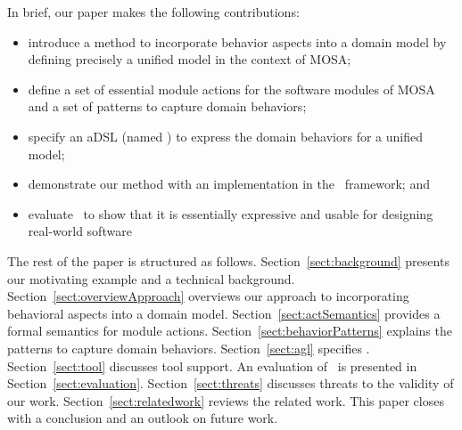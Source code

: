 In brief, our paper makes the following contributions:
%
\begin{itemize}[leftmargin=*]
	\item introduce a method to incorporate behavior aspects into a domain model by defining precisely a unified model in the context of MOSA;
	\item define a set of essential module actions for the software modules of MOSA and a set of patterns to capture domain behaviors;
	\item specify an aDSL (named \agl) to express the domain behaviors for a unified model;
	\item demonstrate our method with an implementation in the \jdomainapp~framework; and
  \item evaluate \agl~to show that it is essentially expressive and usable for designing real-world software
\end{itemize}

The rest of the paper is structured as follows. Section~\ref{sect:background} presents our motivating example and a technical background. 
Section~\ref{sect:overviewApproach} overviews our approach to incorporating behavioral aspects into a domain model. 
Section~\ref{sect:actSemantics} provides a formal semantics for module actions. Section~\ref{sect:behaviorPatterns} explains the patterns to capture domain behaviors.  
Section~\ref{sect:agl} specifies \agl. 
Section~\ref{sect:tool} discusses tool support.
An evaluation of \agl~is presented in Section~\ref{sect:evaluation}. Section~\ref{sect:threats} discusses threats to the validity of our work.
Section~\ref{sect:relatedwork} reviews the related work. This paper closes with a conclusion and an outlook on future work.
